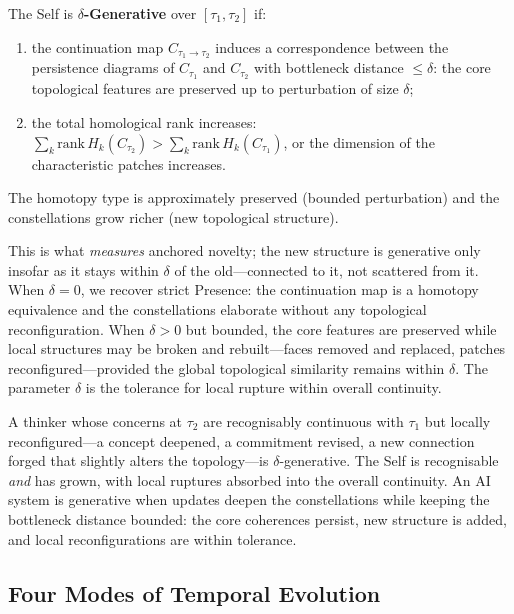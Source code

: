 \begin{definition}
\label{def:generativity}
The Self is \textbf{$\delta$-Generative} over $[\tau_1, \tau_2]$ if:
\begin{enumerate}
\item the continuation map $C_{\tau_1 \to \tau_2}$ induces a correspondence between the persistence diagrams of $C_{\tau_1}$ and $C_{\tau_2}$ with bottleneck distance $\leq \delta$: the core topological features are preserved up to perturbation of size $\delta$;
\item the total homological rank increases: $\sum_k \mathrm{rank}\, H_k(C_{\tau_2}) > \sum_k \mathrm{rank}\, H_k(C_{\tau_1})$, or the dimension of the characteristic patches increases.
\end{enumerate}
The homotopy type is approximately preserved (bounded perturbation) and the constellations grow richer (new topological structure).
\end{definition}

This is what \emph{measures} anchored novelty; the new structure is generative only insofar as it stays within $\delta$ of the old---connected to it, not scattered from it. When $\delta = 0$, we recover strict Presence: the continuation map is a homotopy equivalence and the constellations elaborate without any topological reconfiguration. When $\delta > 0$ but bounded, the core features are preserved while local structures may be broken and rebuilt---faces removed and replaced, patches reconfigured---provided the global topological similarity remains within $\delta$. The parameter $\delta$ is the tolerance for local rupture within overall continuity.

A thinker whose concerns at $\tau_2$ are recognisably continuous with $\tau_1$ but locally reconfigured---a concept deepened, a commitment revised, a new connection forged that slightly alters the topology---is $\delta$-generative. The Self is recognisable \emph{and} has grown, with local ruptures absorbed into the overall continuity. An AI system is generative when updates deepen the constellations while keeping the bottleneck distance bounded: the core coherences persist, new structure is added, and local reconfigurations are within tolerance.


\subsection{Four Modes of Temporal Evolution}

